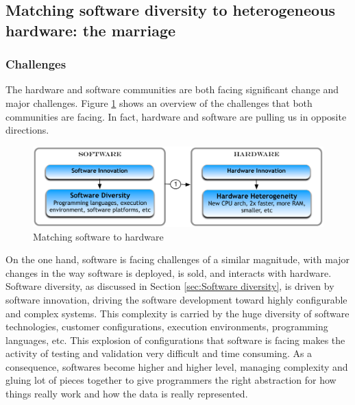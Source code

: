 


\subsection{Matching software diversity to heterogeneous hardware: the marriage}
\subsubsection{Challenges}
The hardware and software communities are both facing significant change and major challenges. Figure \ref{fig:marriage} shows an overview of the challenges that both communities are facing. In fact, hardware and software are pulling us in opposite directions. 

\begin{figure}[h]
	\center
	\includegraphics[scale=0.65]{Background/fig/marriage}
	\caption{Matching software to hardware}
	\label{fig:marriage}
\end{figure}


On the one hand, software is facing challenges of a similar magnitude, with major changes in the way software is deployed, is sold, and interacts with hardware. 
Software diversity, as discussed in Section \ref{sec:Software diversity}, is driven by software innovation, driving the software development toward highly configurable and complex systems. This complexity is carried by the huge diversity of software technologies, customer configurations, execution environments, programming languages, etc. This explosion of configurations that software is facing makes the activity of testing and validation very difficult and time consuming. 
As a consequence, softwares become higher and higher level, managing complexity and gluing lot of pieces together to give programmers the right abstraction for how things really work and how the data is really represented. 


